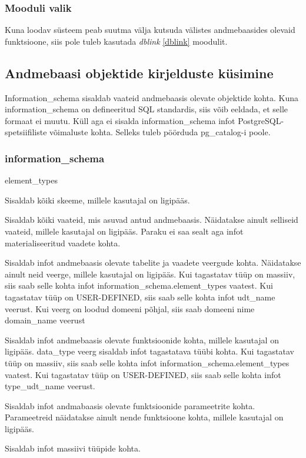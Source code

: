 \documentclass[a4paper,12pt]{article} %
\begin{document}
\subsubsection{Mooduli valik}
Kuna loodav süsteem peab suutma välja kutsuda välistes andmebaasides olevaid funktsioone, siis pole tuleb kasutada \textit{dblink} \ref{dblink} moodulit.

\subsection{Andmebaasi objektide kirjelduste küsimine}
\label{andmebaasi_objektide_kirjelduste_küsimine}
Information\_schema sisaldab vaateid andmebaasis olevate objektide kohta. Kuna information\_schema on defineeritud SQL standardis, siis võib eeldada, et selle formaat ei muutu. \cite{PostgreSQLInformationSchema} Küll aga ei sisalda information\_schema infot PostgreSQL-spetsiifiliste võimaluste kohta. Selleks tuleb pöörduda pg\_catalog-i poole. \cite{PostgreSQLSystemCatalogs}
\subsubsection{information\_schema}
\begin{labeling}{element\_types}
\item [schemata] Sisaldab kõiki skeeme, millele kasutajal on ligipääs.
\item [views] Sisaldab kõiki vaateid, mis asuvad antud andmebaasis. Näidatakse ainult selliseid vaateid, millele kasutajal on ligipääs. Paraku ei saa sealt aga infot materialiseeritud vaadete kohta.
\item [columns] Sisaldab infot andmebaasis olevate tabelite ja vaadete veergude kohta. Näidatakse ainult neid veerge, millele kasutajal on ligipääs. Kui tagastatav tüüp on massiiv, siis saab selle kohta infot information\_schema.element\_types vaatest. Kui tagastatav tüüp on USER-DEFINED, siis saab selle kohta infot udt\_name veerust. Kui veerg on loodud domeeni põhjal, siis saab domeeni nime domain\_name veerust
\item [routines] Sisaldab infot andmebaasis olevate funktsioonide kohta, millele kasutajal on ligipääs. data\_type veerg sisaldab infot tagastatava tüübi kohta. Kui tagastatav tüüp on massiiv, siis saab selle kohta infot information\_schema.element\_types vaatest. Kui tagastatav tüüp on USER-DEFINED, siis saab selle kohta infot type\_udt\_name veerust.
\item [parameters] Sisaldab infot andmabaasis olevate funktsioonide parameetrite kohta. Parameetreid näidatakse ainult nende funktsioone kohta, millele kasutajal on ligipääs.
\item [element\_types] Sisaldab infot massiivi tüüpide kohta.
\end{labeling}
\cite{PostgreSQLInformationSchema}
\end{document}

